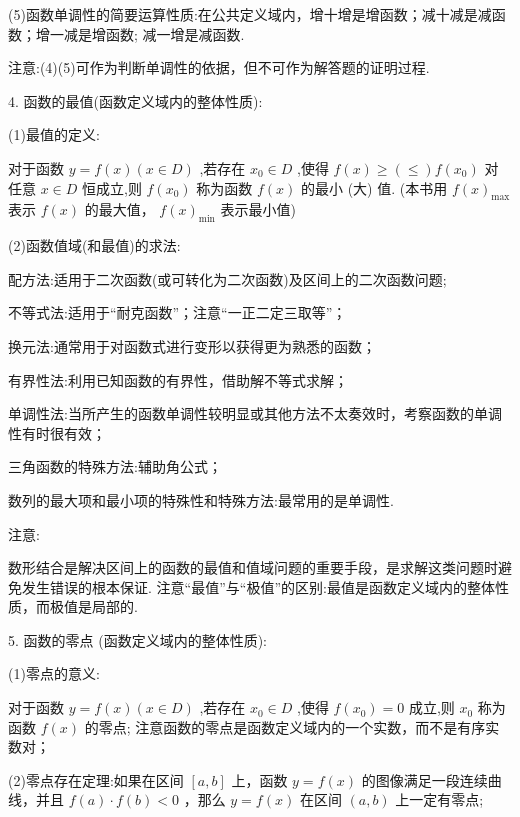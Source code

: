 (5)函数单调性的简要运算性质:在公共定义域内，增十增是增函数；减十减是减函数；增一减是增函数; 减一增是减函数.

注意:(4)(5)可作为判断单调性的依据，但不可作为解答题的证明过程.

4. 函数的最值(函数定义域内的整体性质):

(1)最值的定义:

对于函数 $y = f\left( x\right) \left( {x \in  D}\right)$ ,若存在 ${x}_{0} \in  D$ ,使得 $f\left( x\right)  \geq  \left(  \leq  \right) f\left( {x}_{0}\right)$ 对任意 $x \in  D$ 恒成立,则 $f\left( {x}_{0}\right)$ 称为函数 $f\left( x\right)$ 的最小 (大) 值. (本书用 $f{\left( x\right) }_{\max }$ 表示 $f\left( x\right)$ 的最大值， $f{\left( x\right) }_{\min }$ 表示最小值)

(2)函数值域(和最值)的求法:

  配方法:适用于二次函数(或可转化为二次函数)及区间上的二次函数问题;

  不等式法:适用于“耐克函数”；注意“一正二定三取等”；

  换元法:通常用于对函数式进行变形以获得更为熟悉的函数；

  有界性法:利用已知函数的有界性，借助解不等式求解；

  单调性法:当所产生的函数单调性较明显或其他方法不太奏效时，考察函数的单调性有时很有效；

  三角函数的特殊方法:辅助角公式；

  数列的最大项和最小项的特殊性和特殊方法:最常用的是单调性.

注意:

  数形结合是解决区间上的函数的最值和值域问题的重要手段，是求解这类问题时避免发生错误的根本保证.    注意“最值”与“极值”的区别:最值是函数定义域内的整体性质，而极值是局部的.

5. 函数的零点 (函数定义域内的整体性质):

(1)零点的意义:

对于函数 $y = f\left( x\right) \left( {x \in  D}\right)$ ,若存在 ${x}_{0} \in  D$ ,使得 $f\left( {x}_{0}\right)  = 0$ 成立,则 ${x}_{0}$ 称为函数 $f\left( x\right)$ 的零点; 注意函数的零点是函数定义域内的一个实数，而不是有序实数对；

(2)零点存在定理:如果在区间 $\left\lbrack  {a,b}\right\rbrack$ 上，函数 $y = f\left( x\right)$ 的图像满足一段连续曲线，并且 $f\left( a\right)  \cdot  f\left( b\right)  < 0$ ，那么 $y = f\left( x\right)$ 在区间 $\left( {a,b}\right)$ 上一定有零点;

